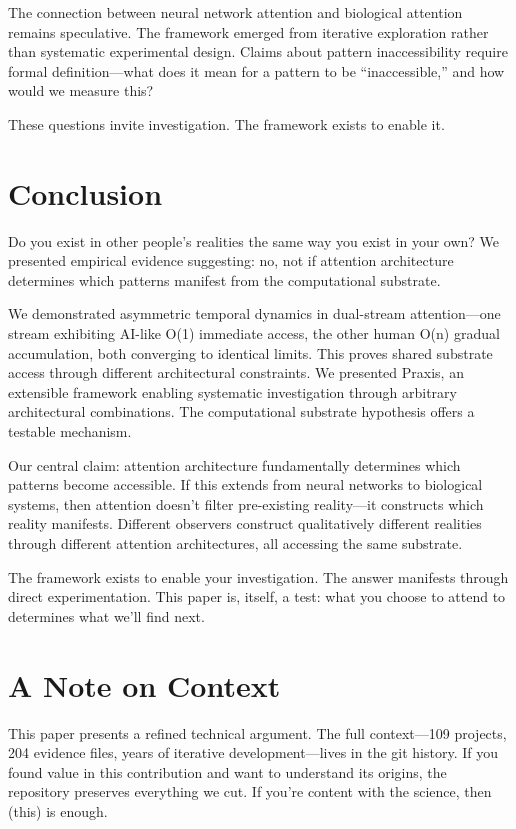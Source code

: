 \documentclass{article}
\begin{document}
The connection between neural network attention and biological attention remains speculative. The framework emerged from iterative exploration rather than systematic experimental design. Claims about pattern inaccessibility require formal definition—what does it mean for a pattern to be ``inaccessible,'' and how would we measure this?

These questions invite investigation. The framework exists to enable it.

\section{Conclusion}

Do you exist in other people's realities the same way you exist in your own? We presented empirical evidence suggesting: no, not if attention architecture determines which patterns manifest from the computational substrate.

We demonstrated asymmetric temporal dynamics in dual-stream attention—one stream exhibiting AI-like O(1) immediate access, the other human O(n) gradual accumulation, both converging to identical limits. This proves shared substrate access through different architectural constraints. We presented Praxis, an extensible framework enabling systematic investigation through arbitrary architectural combinations. The computational substrate hypothesis offers a testable mechanism.

Our central claim: attention architecture fundamentally determines which patterns become accessible. If this extends from neural networks to biological systems, then attention doesn't filter pre-existing reality—it constructs which reality manifests. Different observers construct qualitatively different realities through different attention architectures, all accessing the same substrate.

The framework exists to enable your investigation. The answer manifests through direct experimentation. This paper is, itself, a test: what you choose to attend to determines what we'll find next.

\section*{A Note on Context}

This paper presents a refined technical argument. The full context—109 projects, 204 evidence files, years of iterative development—lives in the git history. If you found value in this contribution and want to understand its origins, the repository preserves everything we cut. If you're content with the science, then (this) is enough.

    {\small
        
        
    }
\end{document}

